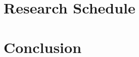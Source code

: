 \documentclass[11pt]{article}
\begin{document}

\section{Research Schedule}
\label{sec:schedule}


\section{Conclusion}
\label{sec:conclusion}




\end{document}
